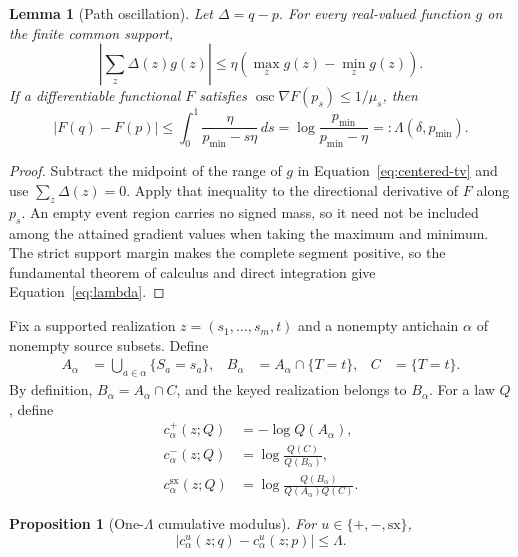 \documentclass[11pt]{article}
\newtheorem{lemma}[theorem]{Lemma}
\newtheorem{proposition}[theorem]{Proposition}
\theoremstyle{definition}
\newcommand{\sx}{\mathrm{sx}}
\begin{document}
\begin{lemma}[Path oscillation]\label{lem:path-oscillation}
Let $\Delta=q-p$.  For every real-valued function $g$ on the finite common support,
\begin{equation}\label{eq:centered-tv}
  \left|\sum_z\Delta(z)g(z)\right|
  \le
  \eta\left(\max_zg(z)-\min_zg(z)\right).
\end{equation}
If a differentiable functional $F$ satisfies
$\operatorname{osc}\nabla F(p_s)\le1/\mu_s$, then
\begin{equation}\label{eq:lambda}
  |F(q)-F(p)|
  \le
  \int_0^1\frac{\eta}{p_{\min}-s\eta}\,ds
  =
  \log\frac{p_{\min}}{p_{\min}-\eta}
  =:\Lambda(\delta,p_{\min}).
\end{equation}
\end{lemma}

	\begin{proof}
	Subtract the midpoint of the range of $g$ in Equation~\eqref{eq:centered-tv} and use
	$\sum_z\Delta(z)=0$.  Apply that inequality to the directional derivative of $F$ along $p_s$.
	An empty event region carries no signed mass, so it need not be included among the attained
	gradient values when taking the maximum and minimum.
	The strict support margin makes the complete segment positive, so the fundamental theorem of
	calculus and direct integration give Equation~\eqref{eq:lambda}.
	\end{proof}

Fix a supported realization $z=(s_1,\ldots,s_m,t)$ and a nonempty antichain $\alpha$ of nonempty
source subsets.  Define
\begin{align}
  A_\alpha
    &=\bigcup_{a\in\alpha}\{S_a=s_a\},&
  B_\alpha
    &=A_\alpha\cap\{T=t\},&
  C
    &=\{T=t\}.
\end{align}
By definition, $B_\alpha=A_\alpha\cap C$, and the keyed realization belongs to $B_\alpha$.  For a
law $Q$, define
\begin{align}
  c_\alpha^+(z;Q)
    &=-\log Q(A_\alpha),\\
  c_\alpha^-(z;Q)
    &=\log\frac{Q(C)}{Q(B_\alpha)},\\
  c_\alpha^\sx(z;Q)
    &=\log\frac{Q(B_\alpha)}{Q(A_\alpha)Q(C)}.
\end{align}

\begin{proposition}[One-$\Lambda$ cumulative modulus]\label{prop:cumulative-modulus}
For $u\in\{+,-,\sx\}$,
\begin{equation}\label{eq:cumulative-modulus}
  |c_\alpha^u(z;q)-c_\alpha^u(z;p)|\le\Lambda.
\end{equation}
\end{proposition}
\end{document}
